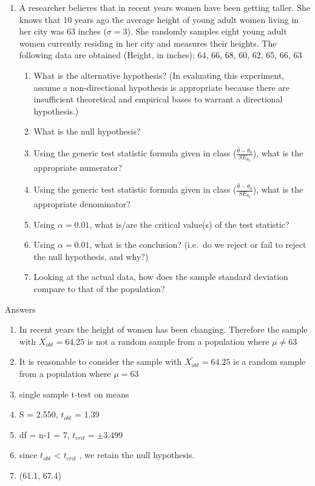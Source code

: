\documentclass[]{article}
\providecommand{\tightlist}{%
  \setlength{\itemsep}{0pt}\setlength{\parskip}{0pt}}
\begin{document}
\begin{enumerate}
\def\labelenumi{\arabic{enumi}.}
\setcounter{enumi}{2}
\item
  A researcher believes that in recent years women have been getting
  taller. She knows that 10 years ago the average height of young adult
  women living in her city was 63 inches (\(\sigma = 3\)). She randomly
  samples eight young adult women currently residing in her city and
  measures their heights. The following data are obtained (Height, in
  inches): 64, 66, 68, 60, 62, 65, 66, 63

  \begin{enumerate}
  \def\labelenumii{\alph{enumii}.}
  \tightlist
  \item
    What is the alternative hypothesis? (In evaluating this experiment,
    assume a non-directional hypothesis is appropriate because there are
    insufficient theoretical and empirical bases to warrant a
    directional hypothesis.)
  \item
    What is the null hypothesis?
  \item
    Using the generic test statistic formula given in class
    (\(\frac{\hat{\theta}-{\theta_0}}{SE_{\theta_0}}\)), what is the
    appropriate numerator?
  \item
    Using the generic test statistic formula given in class
    (\(\frac{\hat{\theta}-{\theta_0}}{SE_{\theta_0}}\)), what is the
    appropriate denominator?
  \item
    Using \(\alpha = 0.01\), what is/are the critical value(s) of the
    test statistic?
  \item
    Using \(\alpha = 0.01\), what is the conclusion? (i.e.~do we reject
    or fail to reject the null hypothesis, and why?)
  \item
    Looking at the actual data, how does the sample standard deviation
    compare to that of the population?
  \end{enumerate}
\end{enumerate}

Answers

\begin{enumerate}
\def\labelenumi{\alph{enumi})}
\item
  In recent years the height of women has been changing. Therefore the
  sample with \(\bar{X_{obt}} = 64.25\) is not a random sample from a
  population where \(\mu \neq 63\)
\item
  It is reasonable to consider the sample with \(\bar{X_{obt}} = 64.25\)
  is a random sample from a population where \(\mu = 63\)
\item
  single sample t-test on means
\item
  S = 2.550, \(t_{obt}\) = 1.39
\item
  df = n-1 = 7, \(t_{crit} = \pm 3.499\)
\item
  since \textbar{} \(t_{obt}\) \textbar{} \textless{} \textbar{}
  \(t_{crit}\) \textbar{} , we retain the null hypothesis.
\item
  (61.1, 67.4)
\end{enumerate}
\end{document}
